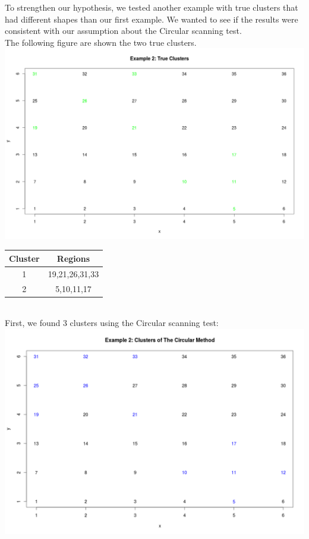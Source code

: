 \documentclass[12pt]{article}
\begin{document}
To strengthen our hypothesis, we tested another example with true clusters that had different shapes than our first example. We wanted to see if the results were consistent with our assumption about the Circular scanning test.\\ 
The following figure are shown the two true clusters.\\
\includegraphics[scale=0.2]{ex2_true}\\

\hspace{4cm}\begin{tabular}{|c|c|}
	\hline
	Cluster & Regions \\
	\hline
	1 & 19,21,26,31,33 \\
	2 & 5,10,11,17 \\ \hline
\end{tabular} \\

First, we found 3 clusters using the Circular scanning test:\\
\includegraphics[scale=0.2]{Ex2:Circular} \\
\end{document}
